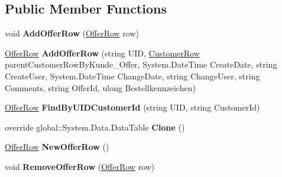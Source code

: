 \subsection*{Public Member Functions}
\begin{DoxyCompactItemize}
\item 
void {\bfseries Add\+Offer\+Row} (\hyperlink{class_products_1_1_data_1_1ds_sage_1_1_offer_row}{Offer\+Row} row)\hypertarget{class_products_1_1_data_1_1ds_sage_1_1_offer_data_table_aaf8cc5b183f82584d15fb55e4200d38a}{}\label{class_products_1_1_data_1_1ds_sage_1_1_offer_data_table_aaf8cc5b183f82584d15fb55e4200d38a}

\item 
\hyperlink{class_products_1_1_data_1_1ds_sage_1_1_offer_row}{Offer\+Row} {\bfseries Add\+Offer\+Row} (string U\+ID, \hyperlink{class_products_1_1_data_1_1ds_sage_1_1_customer_row}{Customer\+Row} parent\+Customer\+Row\+By\+Kunde\+\_\+\+Offer, System.\+Date\+Time Create\+Date, string Create\+User, System.\+Date\+Time Change\+Date, string Change\+User, string Comments, string Offer\+Id, ulong Bestellkennzeichen)\hypertarget{class_products_1_1_data_1_1ds_sage_1_1_offer_data_table_aa318fd8eb9708bab7ad91b970e1416bc}{}\label{class_products_1_1_data_1_1ds_sage_1_1_offer_data_table_aa318fd8eb9708bab7ad91b970e1416bc}

\item 
\hyperlink{class_products_1_1_data_1_1ds_sage_1_1_offer_row}{Offer\+Row} {\bfseries Find\+By\+U\+I\+D\+Customer\+Id} (string U\+ID, string Customer\+Id)\hypertarget{class_products_1_1_data_1_1ds_sage_1_1_offer_data_table_ad9970b556a33d64cd877ffbe5d90d022}{}\label{class_products_1_1_data_1_1ds_sage_1_1_offer_data_table_ad9970b556a33d64cd877ffbe5d90d022}

\item 
override global\+::\+System.\+Data.\+Data\+Table {\bfseries Clone} ()\hypertarget{class_products_1_1_data_1_1ds_sage_1_1_offer_data_table_a7168d532c62b5fdc1d6990da897abf3b}{}\label{class_products_1_1_data_1_1ds_sage_1_1_offer_data_table_a7168d532c62b5fdc1d6990da897abf3b}

\item 
\hyperlink{class_products_1_1_data_1_1ds_sage_1_1_offer_row}{Offer\+Row} {\bfseries New\+Offer\+Row} ()\hypertarget{class_products_1_1_data_1_1ds_sage_1_1_offer_data_table_a7fc545604b93bd1604c740c784c58fa6}{}\label{class_products_1_1_data_1_1ds_sage_1_1_offer_data_table_a7fc545604b93bd1604c740c784c58fa6}

\item 
void {\bfseries Remove\+Offer\+Row} (\hyperlink{class_products_1_1_data_1_1ds_sage_1_1_offer_row}{Offer\+Row} row)\hypertarget{class_products_1_1_data_1_1ds_sage_1_1_offer_data_table_a691dd1e25cb06e878eae0c4b7299ff06}{}\label{class_products_1_1_data_1_1ds_sage_1_1_offer_data_table_a691dd1e25cb06e878eae0c4b7299ff06}

\end{DoxyCompactItemize}
